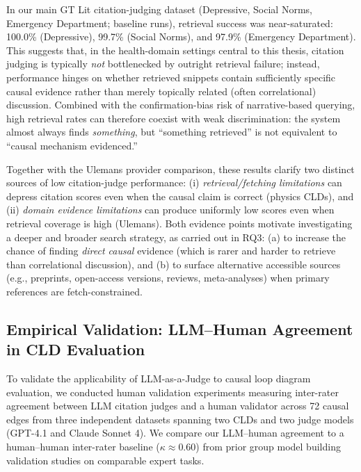 In our main GT Lit citation-judging dataset (Depressive, Social Norms, Emergency Department; baseline runs), retrieval success was near-saturated: 100.0\% (Depressive), 99.7\% (Social Norms), and 97.9\% (Emergency Department). This suggests that, in the health-domain settings central to this thesis, citation judging is typically \textit{not} bottlenecked by outright retrieval failure; instead, performance hinges on whether retrieved snippets contain sufficiently specific causal evidence rather than merely topically related (often correlational) discussion. Combined with the confirmation-bias risk of narrative-based querying, high retrieval rates can therefore coexist with weak discrimination: the system almost always finds \textit{something}, but ``something retrieved'' is not equivalent to ``causal mechanism evidenced.''

Together with the Ulemans provider comparison, these results clarify two distinct sources of low citation-judge performance: (i) \textit{retrieval/fetching limitations} can depress citation scores even when the causal claim is correct (physics CLDs), and (ii) \textit{domain evidence limitations} can produce uniformly low scores even when retrieval coverage is high (Ulemans). Both evidence points motivate investigating a deeper and broader search strategy, as carried out in RQ3: (a) to increase the chance of finding \textit{direct causal} evidence (which is rarer and harder to retrieve than correlational discussion), and (b) to surface alternative accessible sources (e.g., preprints, open-access versions, reviews, meta-analyses) when primary references are fetch-constrained.

\subsection{Empirical Validation: LLM--Human Agreement in CLD Evaluation}
\label{sec:discussion_judge_human_agreement}
To validate the applicability of LLM-as-a-Judge to causal loop diagram evaluation, we conducted human validation experiments measuring inter-rater agreement between LLM citation judges and a human validator across 72 causal edges from three independent datasets spanning two CLDs and two judge models (GPT-4.1 and Claude Sonnet 4). We compare our LLM--human agreement to a human--human inter-rater baseline ($\kappa \approx 0.60$) from prior group model building validation studies on comparable expert tasks.


